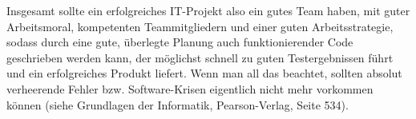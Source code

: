 \documentclass[12pt]{scrartcl}
\begin{document}
\newline
\newline
Insgesamt sollte ein erfolgreiches IT-Projekt also ein gutes Team haben, mit guter Arbeitsmoral, kompetenten Teammitgliedern und einer guten Arbeitsstrategie, sodass durch eine gute, überlegte Planung auch funktionierender Code geschrieben werden kann, der möglichst schnell zu guten Testergebnissen führt und ein erfolgreiches Produkt liefert.
\newline
Wenn man all das beachtet, sollten absolut verheerende Fehler bzw. Software-Krisen eigentlich nicht mehr vorkommen können (siehe \glqq Grundlagen der Informatik\grqq  , Pearson-Verlag, Seite 534).

 
\end{document}
